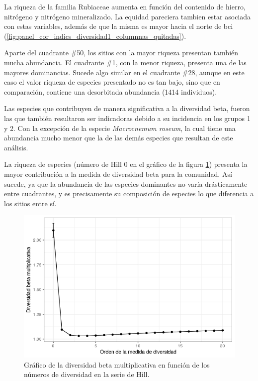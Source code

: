 \documentclass[11pt,]{article}
\begin{document}
La riqueza de la familia Rubiaceae aumenta en función del contenido de
hierro, nitrógeno y nitrógeno mineralizado. La equidad pareciera tambien
estar asociada con estas variables, además de que la misma es mayor
hacia el norte de bci
(\ref{fig:panel_cor_indics_diversidad1_columnnas_quitadas}).

Aparte del cuadrante \#50, los sitios con la mayor riqueza presentan
también mucha abundancia. El cuadrante \#1, con la menor riqueza,
presenta una de las mayores dominancias. Sucede algo similar en el
cuadrante \#28, aunque en este caso el valor riqueza de especies
presentado no es tan bajo, sino que en comparación, contiene una
desorbitada abundancia (1414 individuos).

Las especies que contribuyen de manera significativa a la diversidad
beta, fueron las que también resultaron ser indicadoras debido a su
incidencia en los grupos 1 y 2. Con la excepción de la especie
\emph{Macrocnemum roseum}, la cual tiene una abundancia mucho menor que
la de las demás especies que resultan de este análisis.

La riqueza de especies (número de Hill 0 en el gráfico de la figura
\ref{fig:grafico_divrsdad_beta_hill}) presenta la mayor contribución a
la medida de diversidad beta para la comunidad. Así sucede, ya que la
abundancia de las especies dominantes no varía drásticamente entre
cuadrantes, y es precisamente su composición de especies lo que
diferencia a los sitios entre sí.

\begin{figure}
\centering
\includegraphics[height=0.50000\textwidth]{grafico_divrsdad_beta_hill.png}
\caption{Gráfico de la diversidad beta multiplicativa en función de los
números de diversidad en la serie de Hill.
\label{fig:grafico_divrsdad_beta_hill}}
\end{figure}
\end{document}
